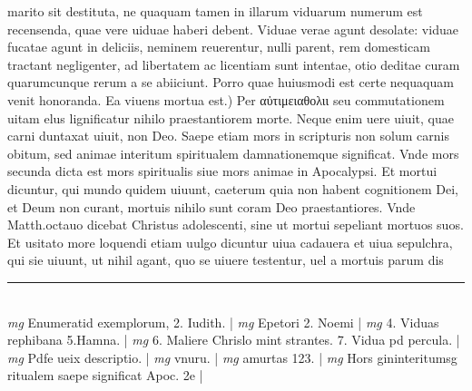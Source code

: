 \documentclass{article}
\begin{document}
\begin{pages}
marito sit destituta, ne quaquam tamen in illarum viduarum numerum est recensenda, quae vere uiduae haberi debent. Viduae verae agunt desolate: viduae fucatae agunt in deliciis, neminem reuerentur, nulli parent, rem domesticam tractant negligenter, ad libertatem ac licentiam sunt intentae, otio deditae curam quarumcunque rerum a se abiiciunt. Porro quae huiusmodi est certe nequaquam venit honoranda.  \pend\pstart Ea viuens mortua est.) Per αὐτιμειαθολιι seu commutationem uitam elus lignificatur nihilo praestantiorem morte. Neque enim uere uiuit, quae carni duntaxat uiuit, non Deo. Saepe etiam mors in scripturis non solum carnis obitum, sed animae interitum spiritualem damnationemque significat. Vnde mors secunda dicta est mors spiritualis siue mors animae in Apocalypsi. Et mortui dicuntur, qui mundo quidem uiuunt, caeterum quia non habent cognitionem Dei, et Deum non curant, mortuis nihilo sunt coram Deo praestantiores. Vnde Matth.octauo dicebat Christus adolescenti, sine ut mortui sepeliant mortuos suos. Et usitato more loquendi etiam uulgo dicuntur uiua cadauera et uiua sepulchra, qui sie uiuunt, ut nihil agant, quo se uiuere testentur, uel a mortuis parum dis  \pend
\vspace{0.5cm}\noindent
\vspace{0.2cm}\rule{1cm}{0.2pt}\\ 
\hspace{0.2cm}\textit{mg}
\footnotesize Enumeratid exemplorum, 2. Iudith. 
\normalsize| 
\hspace{0.2cm}\textit{mg}
\footnotesize Epetori 2. Noemi
\normalsize| 
\hspace{0.2cm}\textit{mg}
\footnotesize 4. Viduas rephibana 5.Hamna. 
\normalsize| 
\hspace{0.2cm}\textit{mg}
\footnotesize 6. Maliere Chrislo mint strantes. 7. Vidua pd percula. 
\normalsize| 
\hspace{0.2cm}\textit{mg}
\footnotesize Pdfe ueix descriptio. 
\normalsize| 
\hspace{0.2cm}\textit{mg}
\footnotesize vnuru. 
\normalsize| 
\hspace{0.2cm}\textit{mg}
\footnotesize amurtas 123. 
\normalsize| 
\hspace{0.2cm}\textit{mg}
\footnotesize Hors gininteritumsg ritualem saepe significat Apoc. 2e 
\normalsize| 

\end{pages}
\end{document}
